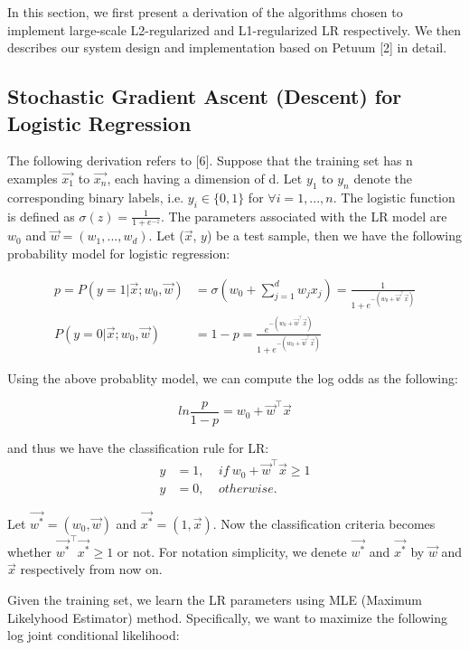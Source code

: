 \documentclass{article} %
\begin{document}
In this section, we first present a derivation of the algorithms chosen to implement large-scale L2-regularized and L1-regularized LR respectively. We then describes our system design and implementation based on Petuum [2] in detail.

\subsection{Stochastic Gradient Ascent (Descent) for Logistic Regression}

The following derivation refers to [6]. Suppose that the training set has n examples $\vec{x_1}$ to $\vec{x_n}$, each having a dimension of d. Let $y_1$ to $y_n$ denote the corresponding binary labels, i.e. $y_i \in \{0, 1\}$ for $\forall i = 1, ..., n$. The logistic function is defined as $\sigma(z) = \frac{1}{1+e^{-z}}$. The parameters associated with the LR model are $w_0$ and $\vec{w} = (w_1, ..., w_d)$. Let ($\vec{x}$, $y$) be a test sample, then we have the following probability model for logistic regression:

\begin{align*}
    p = P(y=1 | \vec{x}; w_0, \vec{w}) &= \sigma(w_0 + \sum\limits_{j=1}^d w_jx_j) = \frac{1}{1 + e^{-(w_0 + \vec{w}^\top\vec{x})}}\\
    P(y=0 | \vec{x}; w_0, \vec{w}) &= 1 - p = \frac{e^{-(w_0 + \vec{w}^\top\vec{x})}}{1 + e^{-(w_0 + \vec{w}^\top\vec{x})}}
\end{align*}


Using the above probablity model, we can compute the log odds as the following:

\begin{equation}
  ln\frac{p}{1-p} = w_0 + \vec{w}^\top\vec{x}
\end{equation}

and thus we have the classification rule for LR:
\begin{align*}
  y &= 1, \ \ \ \ \ if \ w_0 + \vec{w}^\top\vec{x} \geq 1\\
  y &= 0, \ \ \ \ \ otherwise.
\end{align*}

Let $\vec{w^*} = (w_0, \vec{w})$ and $\vec{x^*} = (1, \vec{x})$. Now the classification criteria becomes whether $\vec{w^*}^\top\vec{x^*} \geq 1$ or not. For notation simplicity, we denete $\vec{w^*}$ and $\vec{x^*}$ by $\vec{w}$ and $\vec{x}$ respectively from now on.

Given the training set, we learn the LR parameters using MLE (Maximum Likelyhood Estimator) method. Specifically, we want to maximize the following log joint conditional likelihood:
\end{document}
